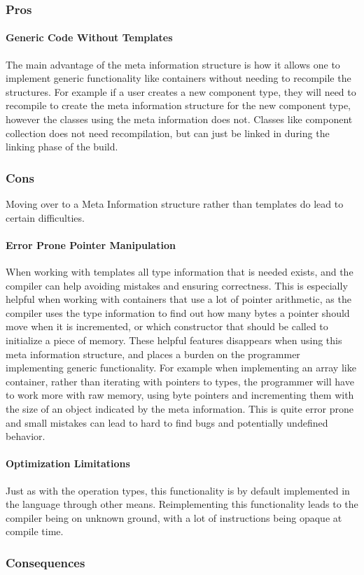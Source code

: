 \subsubsection{Pros}
\paragraph{Generic Code Without Templates}
The main advantage of the meta information structure is how it allows one to implement
generic functionality like containers without needing to recompile the structures.
For example if a user creates a new component type, they will need to recompile to create
the meta information structure for the new component type, however the classes using the
meta information does not. Classes like component collection does not need recompilation,
but can just be linked in during the linking phase of the build.

\subsubsection{Cons}
Moving over to a Meta Information structure rather than templates do lead to certain difficulties.

\paragraph{Error Prone Pointer Manipulation}
When working with templates all type information that is needed exists, and the compiler can help avoiding mistakes and ensuring correctness.
This is especially helpful when working with containers that use a lot of pointer arithmetic,
as the compiler uses the type information to find out how many bytes a pointer should move
when it is incremented, or which constructor that should be called to initialize a piece of memory.
These helpful features disappears when using this meta information structure, and places a burden on the programmer implementing generic functionality.
For example when implementing an array like container,
rather than iterating with pointers to types, the programmer will have to work more with raw memory,
using byte pointers and incrementing them with the size of an object indicated by the meta information.
This is quite error prone and small mistakes can lead to hard to find bugs and potentially undefined behavior.

\paragraph{Optimization Limitations}
Just as with the operation types, this functionality is by default implemented in the language
through other means. Reimplementing this functionality leads to the compiler being on unknown
ground, with a lot of instructions being opaque at compile time.

\subsubsection{Consequences}

